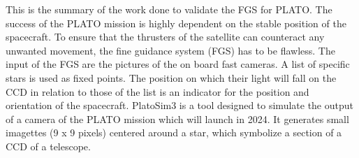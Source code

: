 This is the summary of the work done to validate the FGS for PLATO.
\newline
The success of the PLATO mission is highly dependent on the stable position of the spacecraft. To ensure that the thrusters of the satellite can counteract any unwanted movement, the fine guidance system (FGS) has to be flawless. The input of the FGS are the pictures of the on board fast cameras. A list of specific stars is used as fixed points. The position on which their light will fall on the CCD in relation to those of the list is an indicator for the position and orientation of the spacecraft. 
\newline
PlatoSim3 is a tool designed to simulate the output of a camera of the PLATO mission which will launch in 2024. It generates small imagettes (9 x 9 pixels) centered around a star, which symbolize a section of a CCD of a telescope. 